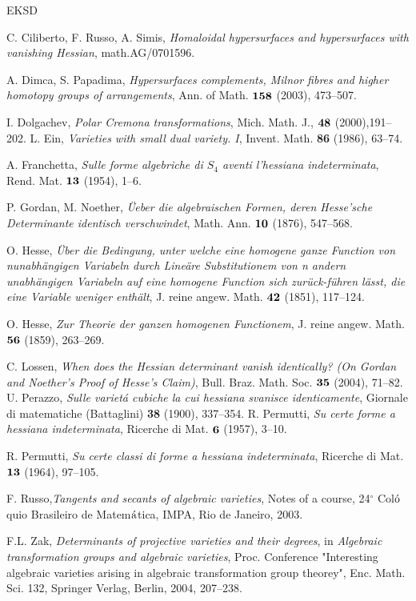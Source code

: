 \documentclass[11pt,a4paper]{amsart}
\begin{document}
\begin{thebibliography}{EKSD}



 C. Ciliberto, F. Russo, A. Simis, {\it Homaloidal hypersurfaces and hypersurfaces with vanishing Hessian}, math.AG/0701596.

 A. Dimca, S. Papadima, {\it Hypersurfaces complements, Milnor fibres and higher homotopy groups of arrangements}, Ann. of Math. $\bf{158}$ (2003), 473--507.

 I. Dolgachev, {\it Polar Cremona transformations}, Mich. Math. J.,  $\bf{48}$  (2000),191--202.
 L. Ein, {\it Varieties with small dual variety. I},
 Invent. Math.  {\bf 86} (1986), 63--74.


 A. Franchetta, {\it Sulle forme algebriche di $S_4$ aventi l'hessiana indeterminata}, Rend. Mat. $\bf{13}$ (1954), 1--6.

 P. Gordan, M. Noether, {\it \"Ueber die algebraischen Formen, deren Hesse'sche Determinante identisch verschwindet}, Math. Ann. $\bf{10}$ (1876), 547--568.


 O. Hesse, {\it \"Uber die Bedingung, unter  welche eine homogene ganze Function von nunabh\"angigen Variabeln durch Line\"are Substitutionem von n andern unabh\"angigen Variabeln auf eine homogene Function sich zur\"uck-f\"uhren l\"asst, die eine Variable weniger enth\"alt},  J. reine angew. Math. $\bf{42}$ (1851), 117--124.


 O. Hesse, {\it Zur Theorie der ganzen homogenen Functionem},  J. reine angew. Math. $\bf{56}$ (1859), 263--269.


 C. Lossen, {\it When does the Hessian determinant vanish identically? (On Gordan and Noether's Proof of Hesse's Claim)}, Bull. Braz.
Math. Soc. $\bf{35}$ (2004), 71--82.
 U. Perazzo, {\it Sulle variet\'a cubiche la cui hessiana svanisce
identicamente}, Giornale di matematiche (Battaglini) {\bf 38}
(1900), 337--354.
 R. Permutti, {\it Su certe forme a hessiana indeterminata}, Ricerche di Mat. $\bf{6}$ (1957), 3--10.

 R. Permutti, {\it Su certe classi di forme a hessiana indeterminata}, Ricerche di Mat. $\bf{13}$ (1964), 97--105.

  F. Russo,{\it Tangents and secants of algebraic varieties}, Notes of a course, 24$^\circ$ Col$ {\rm \acute{o}}$quio Brasileiro de Matem${\rm \acute{a}}$tica, IMPA, Rio de Janeiro, 2003.

F.L. Zak, {\it Determinants of projective varieties and their degrees}, in {\it Algebraic transformation groups and algebraic varieties}, Proc. Conference "Interesting algebraic varieties arising in algebraic transformation group theorey", Enc. Math. Sci. 132, Springer Verlag, Berlin, 2004, 207--238.


\end{thebibliography}
\end{document}
